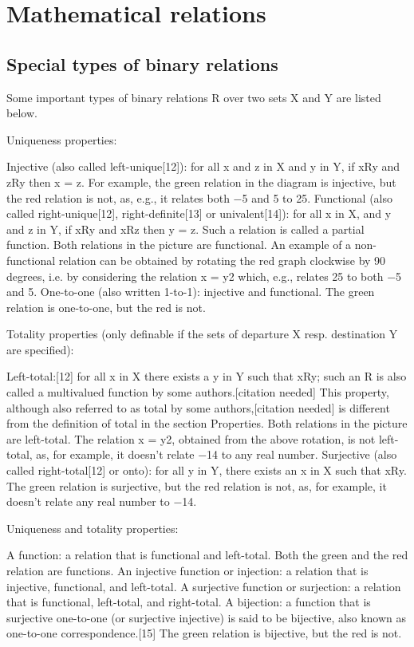 \documentclass{article}
\begin{document}
\section{Mathematical relations}
\subsection{Special types of binary relations}
Some important types of binary relations R over two sets X and Y are listed below.

Uniqueness properties:

    Injective (also called left-unique[12]): for all x and z in X and y in Y, if xRy and zRy then x = z. For example, the green relation in the diagram is injective, but the red relation is not, as, e.g., it relates both −5 and 5 to 25.
    Functional (also called right-unique[12], right-definite[13] or univalent[14]): for all x in X, and y and z in Y, if xRy and xRz then y = z. Such a relation is called a partial function. Both relations in the picture are functional. An example of a non-functional relation can be obtained by rotating the red graph clockwise by 90 degrees, i.e. by considering the relation x = y2 which, e.g., relates 25 to both −5 and 5.
    One-to-one (also written 1-to-1): injective and functional. The green relation is one-to-one, but the red is not.

Totality properties (only definable if the sets of departure X resp. destination Y are specified):

    Left-total:[12] for all x in X there exists a y in Y such that xRy; such an R is also called a multivalued function by some authors.[citation needed] This property, although also referred to as total by some authors,[citation needed] is different from the definition of total in the section Properties. Both relations in the picture are left-total. The relation x = y2, obtained from the above rotation, is not left-total, as, for example, it doesn't relate −14 to any real number.
    Surjective (also called right-total[12] or onto): for all y in Y, there exists an x in X such that xRy. The green relation is surjective, but the red relation is not, as, for example, it doesn't relate any real number to −14.

Uniqueness and totality properties:

    A function: a relation that is functional and left-total. Both the green and the red relation are functions.
    An injective function or injection: a relation that is injective, functional, and left-total.
    A surjective function or surjection: a relation that is functional, left-total, and right-total.
    A bijection: a function that is surjective one-to-one (or surjective injective) is said to be bijective, also known as one-to-one correspondence.[15] The green relation is bijective, but the red is not. 
\end{document}
